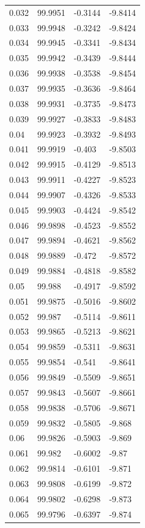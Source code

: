 \begin{tabular}{llll}
0.032 & 99.9951 & -0.3144 & -9.8414 \\
0.033 & 99.9948 & -0.3242 & -9.8424 \\
0.034 & 99.9945 & -0.3341 & -9.8434 \\
0.035 & 99.9942 & -0.3439 & -9.8444 \\
0.036 & 99.9938 & -0.3538 & -9.8454 \\
0.037 & 99.9935 & -0.3636 & -9.8464 \\
0.038 & 99.9931 & -0.3735 & -9.8473 \\
0.039 & 99.9927 & -0.3833 & -9.8483 \\
0.04 & 99.9923 & -0.3932 & -9.8493 \\
0.041 & 99.9919 & -0.403 & -9.8503 \\
0.042 & 99.9915 & -0.4129 & -9.8513 \\
0.043 & 99.9911 & -0.4227 & -9.8523 \\
0.044 & 99.9907 & -0.4326 & -9.8533 \\
0.045 & 99.9903 & -0.4424 & -9.8542 \\
0.046 & 99.9898 & -0.4523 & -9.8552 \\
0.047 & 99.9894 & -0.4621 & -9.8562 \\
0.048 & 99.9889 & -0.472 & -9.8572 \\
0.049 & 99.9884 & -0.4818 & -9.8582 \\
0.05 & 99.988 & -0.4917 & -9.8592 \\
0.051 & 99.9875 & -0.5016 & -9.8602 \\
0.052 & 99.987 & -0.5114 & -9.8611 \\
0.053 & 99.9865 & -0.5213 & -9.8621 \\
0.054 & 99.9859 & -0.5311 & -9.8631 \\
0.055 & 99.9854 & -0.541 & -9.8641 \\
0.056 & 99.9849 & -0.5509 & -9.8651 \\
0.057 & 99.9843 & -0.5607 & -9.8661 \\
0.058 & 99.9838 & -0.5706 & -9.8671 \\
0.059 & 99.9832 & -0.5805 & -9.868 \\
0.06 & 99.9826 & -0.5903 & -9.869 \\
0.061 & 99.982 & -0.6002 & -9.87 \\
0.062 & 99.9814 & -0.6101 & -9.871 \\
0.063 & 99.9808 & -0.6199 & -9.872 \\
0.064 & 99.9802 & -0.6298 & -9.873 \\
0.065 & 99.9796 & -0.6397 & -9.874 \\

\end{tabular}
